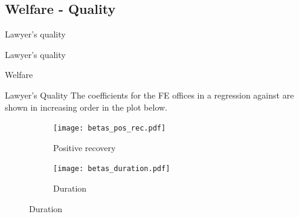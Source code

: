 \documentclass[8pt]{beamer}
\begin{document}
\subsection{Welfare - Quality}
\begin{frame}{Lawyer's quality}

 \begin{table}[H] 
 \begin{subtable}{1.\textwidth}
 \begin{center}
 \tiny{}
 \end{center}
 \end{subtable}
 \end{table}  
 
\end{frame}


\begin{frame}{Lawyer's quality}

 \begin{table}[H] 
 \begin{subtable}{1.\textwidth}
 \begin{center}
 \tiny{}
 \end{center}
 \end{subtable}
 \end{table}  
 
\end{frame}


\begin{frame}{Welfare}

 \begin{table}[H] 
 \begin{subtable}{1.\textwidth}
 \begin{center}
 \tiny{}
 \end{center}
 \end{subtable}
 \end{table}  
 
\end{frame}


\begin{frame}{Lawyer's Quality}
    The coefficients for the FE offices in a regression against are shown in increasing order in the plot below.
    
    \begin{figure}[H]
    \begin{center}
        \begin{subfigure}{0.49\textwidth}
        \caption{Positive recovery}
            \centering
            \texttt{[image: betas\_pos\_rec.pdf]}
        \end{subfigure}
        \begin{subfigure}{0.49\textwidth}
        \caption{Duration}
                \centering
                \texttt{[image: betas\_duration.pdf]}
        \end{subfigure}
    \end{center} 
\end{figure} 
\end{frame}
\end{document}
